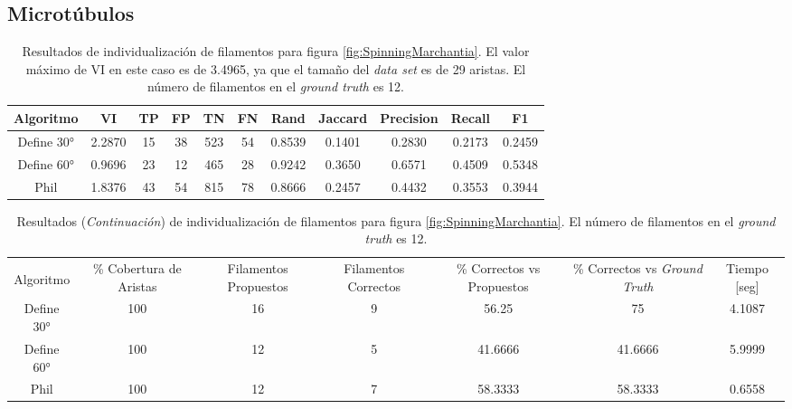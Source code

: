 


\subsection{Microt\'ubulos}


\begin{table}[h]
    \centering
    \begin{tabular}{|c|c|c|c|c|c|c|c|c|c|c|}
    \hline
        Algoritmo & VI & TP & FP &TN &FN & Rand	& Jaccard &	Precision &	Recall &	F1 \\ \hline
        Define 30° & 2.2870  & 15 & 38 & 523 & 54 & 0.8539 & 0.1401 & 0.2830 & 0.2173 & 0.2459\\
        Define 60° & 0.9696 & 23 & 12 & 465 & 28 & 0.9242 & 0.3650 & 0.6571 & 0.4509  & 0.5348 \\ 
        Phil & 1.8376 & 43 & 54 & 815 & 78 & 0.8666 & 0.2457 & 0.4432 & 0.3553 & 0.3944 \\
        \hline
    \end{tabular}
    \caption{Resultados de individualizaci\'on de filamentos para figura \ref{fig:SpinningMarchantia}. El valor m\'aximo de VI en este caso es de 3.4965, ya que el tama\~no del {\it data set} es de 29 aristas. El n\'umero de filamentos en el {\it ground truth} es 12.}
    \label{tab:SpinningMarchantiaResults1}
\end{table}
\addtocounter{table}{-1}
\begin{table}[h]
    \centering
    \begin{tabular}{|c|c|c|c|c|c|c|}
    \hline
         & \multirow{4}{2cm}{\centering \% Cobertura de Aristas} & \multirow{4}{2cm}{Filamentos Propuestos} & \multirow{4}{2cm}{Filamentos Correctos} & \multirow{4}{2.5cm}{\% Correctos vs Propuestos} & \multirow{4}{2.5cm}{\centering \% Correctos vs {\it Ground Truth}} & \multirow{4}{1.2cm}{\centering Tiempo [seg]} \\
         &  &  &  & & &  \\
        Algoritmo &  &  &  & & &  \\
        &  &  &  & & &  \\ \hline
        Define 30° & 100 & 16 & 9 & 56.25       & 75          & 4.1087 \\
        Define 60° & 100 & 12 & 5 & 41.6666 & 41.6666 & 5.9999 \\ 
        Phil & 100 & 12 & 7 & 58.3333 & 58.3333 & 0.6558 \\
        \hline
    \end{tabular}
    \caption{Resultados ({\it Continuaci\'on}) de individualizaci\'on de filamentos para figura \ref{fig:SpinningMarchantia}. El n\'umero de filamentos en el {\it ground truth} es 12.}
\end{table}
